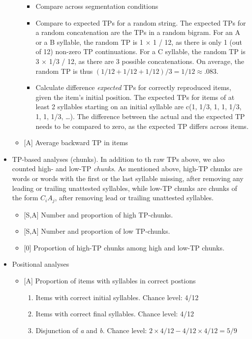 \documentclass[]{article}
\providecommand{\tightlist}{%
  \setlength{\itemsep}{0pt}\setlength{\parskip}{0pt}}
\begin{document}
\begin{itemize}
\begin{itemize}
    \begin{itemize}
    \tightlist
    \item
      Compare across segmentation conditions
    \item
      Compare to expected TPs for a random string. The expected TPs for
      a random concatenation are the TPs in a random bigram. For an A or
      a B syllable, the random TP is 1 \(\times\) 1 / 12, as there is
      only 1 (out of 12) non-zero TP continuations. For a C syllable,
      the random TP is 3 \(\times\) 1/3 / 12, as there are 3 possible
      concatenations. On average, the random TP is thus
      \((1/12 + 1/12 + 1/12)/ 3 = 1/12 \approx .083\).
    \item
      Calculate difference \emph{expected} TPs for correctly reproduced
      items, given the item's initial position. The expected TPs for
      items of at least 2 syllables starting on an initial syllable are
      c(1, 1/3, 1, 1, 1/3, 1, 1, 1/3, \ldots{}). The difference between
      the actual and the expected TP needs to be compared to zero, as
      the expected TP differs across items.
    \end{itemize}
  \item
    {[}A{]} Average backward TP in items
  \end{itemize}
\item
  TP-based analyses (chunks). In addition to th raw TPs above, we also
  counted high- and low-TP \emph{chunks}. As mentioned above, high-TP
  chunks are words or words with the first or the last syllable missing,
  after removing any leading or trailing unattested syllables, while
  low-TP chunks are chunks of the form \(C_iA_j\), after removing lead
  or trailing unattested syllables.

  \begin{itemize}
  \tightlist
  \item
    {[}S,A{]} Number and proportion of high TP-chunks.
  \item
    {[}S,A{]} Number and proportion of low TP-chunks.
  \item
    {[}0{]} Proportion of high-TP chunks among high and low-TP chunks.
  \end{itemize}
\item
  Positional analyses

  \begin{itemize}
  \tightlist
  \item
    {[}A{]} Proportion of items with syllables in correct postions

    \begin{enumerate}
    \def\labelenumi{\alph{enumi}.}
    \tightlist
    \item
      Items with correct initial syllables. Chance level: 4/12
    \item
      Items with correct final syllables. Chance level: 4/12
    \item
      Disjunction of \emph{a} and \emph{b}. Chance level:
      \(2 \times 4/12 - 4/12 \times 4/12 = 5/9\)
    \end{enumerate}
  \end{itemize}
\end{itemize}
\end{document}
